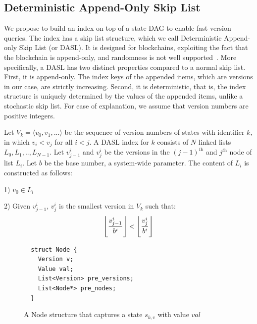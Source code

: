 \subsection{Deterministic Append-Only Skip List} 
We propose to build an index on top of a state DAG to enable fast version queries. The index has a skip list
structure, which we call Deterministic Append-only Skip List (or DASL). It is designed for blockchains,
exploiting the fact that the blockchain is append-only, and randomness is not well
supported~\cite{cachin2016non}. More specifically, a DASL has two distinct properties compared to a normal skip
list. First, it is append-only. The index keys of the appended items, which are versions in our case, are
strictly increasing. Second, it is deterministic, that is,
the index structure is uniquely determined by the values of the appended items, unlike a stochastic skip list.
For ease of explanation, we assume that version numbers are positive integers.

\begin{definition}\label{def:1}
  Let $V_k = \langle v_0, v_1, ...\rangle$ be the sequence of version numbers of states with identifier $k$, in which $v_i <
  v_j$ for all $i<j$. A DASL index for $k$ consists of $N$ linked lists $L_0, L_1,.., L_{N-1}$. Let $v^{i}_{j-1}$ and $v^i_j$ be
  the versions in the $(j-1)^{\textit{th}}$ and $j^{\textit{th}}$ node of list $L_i$. Let $b$ be the base number, a system-wide parameter. The content
  of $L_i$ is constructed as follows:
 
  1) $v_0 \in L_i$

  2) Given $v^i_{j-1}$, $v^i_j$ is the smallest version in $V_k$ such that: 
  \begin{equation}\label{eq:4}
    \floor*{\frac{v^i_{j-1}}{b^i}} < \floor*{\frac{v^i_j}{b^i}}
  \end{equation}
\end{definition}

\begin{figure}
  \centering
  \footnotesize
  \begin{verbatim}
  struct Node {
    Version v;
    Value val;
    List<Version> pre_versions;
    List<Node*> pre_nodes;
  }
  \end{verbatim}
  \caption{A Node structure that captures a state $s_{k,v}$ with value $val$}
  \label{prov:code:node}
\end{figure} 

